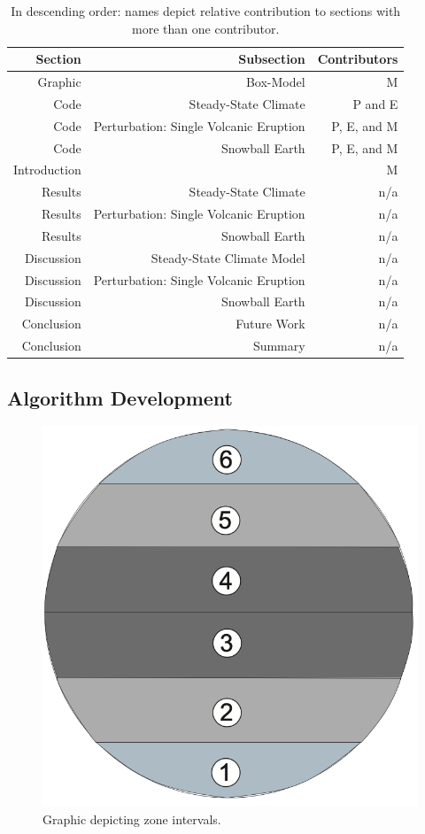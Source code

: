 \documentclass{article}
\begin{document}
\begin{table}[H]
    \centering
    \begin{tabular}{rrr}
    Section & Subsection & Contributors \\
    \hline
    Graphic & Box-Model & M  \\
    Code & Steady-State Climate & P and E \\
    Code & Perturbation: Single Volcanic Eruption & P, E, and M \\
    Code & Snowball Earth & P, E, and M \\
    Introduction &  & M \\
    Results & Steady-State Climate & n/a \\
    Results & Perturbation: Single Volcanic Eruption & n/a \\
    Results & Snowball Earth & n/a\\
    Discussion & Steady-State Climate Model & n/a \\
    Discussion & Perturbation: Single Volcanic Eruption & n/a \\
    Discussion & Snowball Earth & n/a\\
    Conclusion & Future Work & n/a \\
    Conclusion & Summary & n/a \\
    \end{tabular}
    \caption{
        In descending order: names depict relative contribution to
        sections with more than one contributor.
    }
    \label{tab:contributions}
\end{table}

\subsection{Algorithm Development}
\begin{figure}[H]
    \centering
    \includegraphics[scale=0.3]{zones.png}
    \caption{Graphic depicting zone intervals.}
    \label{fig:zones}
\end{figure}
\FloatBarrier
\end{document}
